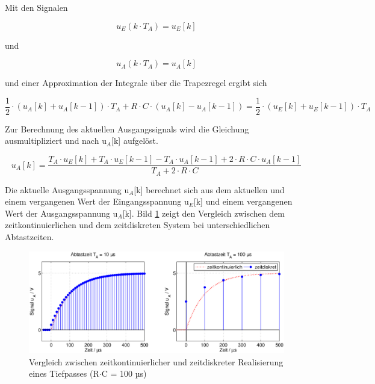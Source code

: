 \noindent Mit den Signalen

\begin{equation}\label{eq:fourthirteen}
u_{E} \left(k\cdot T_{A} \right)=u_{E} \left[k\right]
\end{equation}

\noindent und

\begin{equation}\label{eq:fourfourteen}
u_{A} \left(k\cdot T_{A} \right)=u_{A} \left[k\right]
\end{equation}

\noindent und einer Approximation der Integrale \"{u}ber die Trapezregel ergibt sich

\begin{equation}\label{eq:fourfiveteen}
\frac{1}{2} \cdot \left(u_{A} \left[k\right]+u_{A} \left[k-1\right]\right)\cdot T_{A} +R\cdot C\cdot \left(u_{A} \left[k\right]-u_{A} \left[k-1\right]\right)=\frac{1}{2} \cdot \left(u_{E} \left[k\right]+u_{E} \left[k-1\right]\right)\cdot T_{A}
\end{equation}

\noindent Zur Berechnung des aktuellen Ausgangssignals wird die Gleichung ausmultipliziert und nach u${}_{A}$[k] aufgel\"{o}st.

\begin{equation}\label{eq:foursixteen}
u_{A} \left[k\right]=\frac{T_{A} \cdot u_{E} \left[k\right]+T_{A} \cdot u_{E} \left[k-1\right]-T_{A} \cdot u_{A} \left[k-1\right]+2\cdot R\cdot C\cdot u_{A} \left[k-1\right]}{T_{A} +2\cdot R\cdot C} 
\end{equation}

\noindent Die aktuelle Ausgangsspannung u${}_{A}$[k] berechnet sich aus dem aktuellen und einem vergangenen Wert der Eingangsspannung u${}_{E}$[k] und einem vergangenen Wert der Ausgangsspannung u${}_{A}$[k]. Bild \ref{fig:RCEinschwingen} zeigt den Vergleich zwischen dem zeitkontinuierlichen und dem zeitdiskreten System bei unterschiedlichen Abtastzeiten.

\begin{figure}[H]
  \centerline{\includegraphics[width=1\textwidth]{Kapitel4/Bilder/image6.eps}}
  \caption{Vergleich zwischen zeitkontinuierlicher und zeitdiskreter Realisierung eines Tiefpasses (R$\cdot$C = 100 µs)}
  \label{fig:RCEinschwingen}
\end{figure}

